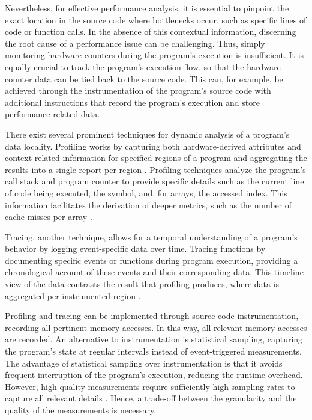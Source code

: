 Nevertheless, for effective performance analysis, it is essential to pinpoint the exact location in the source code where bottlenecks occur, such as specific lines of code or function calls. In the absence of this contextual information, discerning the root cause of a performance issue can be challenging. Thus, simply monitoring hardware counters during the program's execution is insufficient. It is equally crucial to track the program's execution flow, so that the hardware counter data can be tied back to the source code. This can, for example, be achieved through the instrumentation of the program's source code with additional instructions that record the program's execution and store performance-related data.

There exist several prominent techniques for dynamic analysis of a program's data locality. Profiling works by capturing both hardware-derived attributes and context-related information for specified regions of a program and aggregating the results into a single report per region \cite{itzkowitz2003memory,gimenez2017memaxes,adhianto2010hpctoolkit}. Profiling techniques analyze the program's call stack and program counter to provide specific details such as the current line of code being executed, the symbol, and, for arrays, the accessed index. This information facilitates the derivation of deeper metrics, such as the number of cache misses per array \cite{adhianto2010hpctoolkit}.

Tracing, another technique, allows for a temporal understanding of a program's behavior by logging event-specific data over time. Tracing functions by documenting specific events or functions during program execution, providing a chronological account of these events and their corresponding data. This timeline view of the data contrasts the result that profiling produces, where data is aggregated per instrumented region \cite{shende1999profiling,adhianto2010hpctoolkit,mckinley1999quantifying}.

Profiling and tracing can be implemented through source code instrumentation, recording all pertinent memory accesses. In this way, all relevant memory accesses are recorded. An alternative to instrumentation is statistical sampling, capturing the program's state at regular intervals instead of event-triggered measurements. The advantage of statistical sampling over instrumentation is that it avoids frequent interruption of the program's execution, reducing the runtime overhead. However, high-quality measurements require sufficiently high sampling rates to capture all relevant details \cite{adhianto2010hpctoolkit}. Hence, a trade-off between the granularity and the quality of the measurements is necessary.


